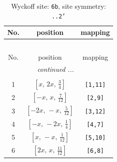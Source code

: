 \documentclass[fleqn,8pt]{jsarticle}
\begin{document}
\begin{longtable}{ccc}
\caption{Wyckoff site: {\tt 6b}, site symmetry: {\tt ..2'}}
 \\
 \hline \hline
No. & position & mapping \\ \hline \endfirsthead

\multicolumn{2}{l}{\tablename\ \thetable{}} \\
 \hline \hline
No. & position & mapping \\ \hline \endhead

 \hline \hline
\multicolumn{2}{r}{\footnotesize\it continued ...} \\ \endfoot

 \hline \hline
\multicolumn{2}{r}{} \\ \endlastfoot

1 & $\left[ x,\, 2 x,\, \frac{3}{4} \right]$ & {\tt [1,11]} \\ \hline
2 & $\left[ - x,\, x,\, \frac{7}{12} \right]$ & {\tt [2,9]} \\ \hline
3 & $\left[ - 2 x,\, - x,\, \frac{5}{12} \right]$ & {\tt [3,12]} \\ \hline
4 & $\left[ - x,\, - 2 x,\, \frac{1}{4} \right]$ & {\tt [4,7]} \\ \hline
5 & $\left[ x,\, - x,\, \frac{1}{12} \right]$ & {\tt [5,10]} \\ \hline
6 & $\left[ 2 x,\, x,\, \frac{11}{12} \right]$ & {\tt [6,8]} \\
\end{longtable}
\renewcommand{\arraystretch}{1.2}
\end{document}
